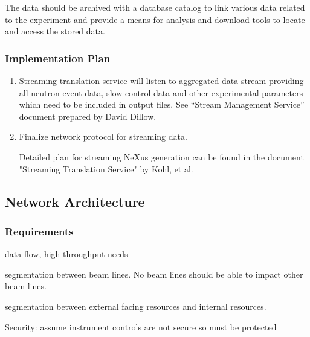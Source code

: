 The data should be archived with a database catalog to link various data
related to the experiment and provide a means for analysis and download
tools to locate and access the stored data.

\subsubsection{Implementation Plan}

\begin{enumerate}

\item Streaming translation service will listen to aggregated data
stream providing all neutron event data, slow control data and other
experimental parameters which need to be included in output files. See
``Stream Management Service'' document prepared by David Dillow.

\item Finalize network protocol for streaming data. 

Detailed plan for streaming NeXus generation
can be found in the document "Streaming Translation Service" by Kohl, et al.

\end{enumerate}


\subsection{Network Architecture}

\subsubsection{Requirements}


data flow, high throughput needs

segmentation between beam lines. No beam lines should be able to impact
other beam lines.

segmentation between external facing resources and internal resources.

Security: assume instrument controls are not secure so must be protected

